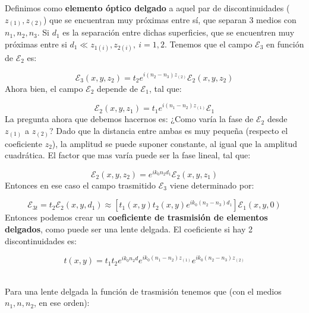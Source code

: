 \documentclass[12pt,a4paper]{book}
\numberwithin{equation}{section}
\numberwithin{figure}{section}
\newcommand{\ccorchetes}[1]{\left[ #1  \right]}
\newcommand{\1}{_{(1)}}
\newcommand{\2}{_{(2)}}
\theoremstyle{definition}
\begin{document}
Definimos como \textbf{elemento óptico delgado} a aquel par de discontinuidades ($z_{(1)},z_{(2)}$) que se encuentran muy próximas entre sí, que separan 3 medios con $n_1,n_2,n_3$. Si $d_1$ es la separación entre dichas superficies, que se encuentren muy próximas entre si  $d_1 \ll z_{1(i)},z_{2(i)}, \ i=1,2$. Tenemos que el campo $\mathcal{E}_3$ en función de $\mathcal{E}_2$ es:

\begin{equation}
\mathcal{E}_3 (x,y,z_2) = t_2 e^{i (n_2-n_3)z_{(2)}} \mathcal{E}_2 (x,y,z_2)
\end{equation}
Ahora bien, el campo $\mathcal{E}_2$ depende de $\mathcal{E}_1$, tal que:

\begin{equation}
\mathcal{E}_2 (x,y,z_1) = t_1 e^{i (n_1-n_2)z_{(1)}} \mathcal{E}_1
\end{equation}
La pregunta ahora que debemos hacernos es: ¿Como varía la fase de $\mathcal{E_2}$ desde $z_{(1)}$ a $z_{(2)}$? Dado que la distancia entre ambas es muy pequeña (respecto el coeficiente $z_2$), la amplitud se puede suponer constante, al igual que la amplitud cuadrática. El factor que mas varía puede ser la fase lineal, tal que:

\begin{equation}
\mathcal{E}_2 (x,y,z_2) = e^{i k_0 n_2 d_1} \mathcal{E}_2 (x,y,z_1)
\end{equation} 
Entonces en ese caso el campo trasmitido $\mathcal{E}_3$ viene determinado por:

\begin{equation}
\mathcal{E}_{3t} = t_2 \mathcal{E}_2 (x,y,d_1) \approx \ccorchetes{ t_1 (x,y) t_2(x,y) e^{i k_0 (n_2-n_3) d_{1}}} \mathcal{E}_1 (x,y,0)
\end{equation}
Entonces podemos crear un \textbf{coeficiente de trasmisión de elementos delgados}, como puede ser una lente delgada. El coeficiente si hay 2 discontinuidades es:

\begin{equation}
t(x,y) = t_1 t_2 e^{ik_0n_2d} e^{i k_0 (n_1-n_2)z_{(1)}} e^{i k_0 (n_2-n_3)z_{(2)}}
\end{equation} \\


\hrulefill

Para una lente delgada la función de trasmisión tenemos que (con el medios $n_1,n,n_2$, en ese orden):
\end{document}
